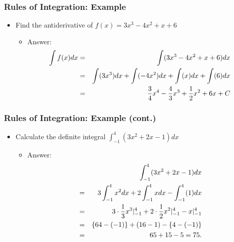 \documentclass[pdflatex, 12pt]{beamer}
\begin{document}
\begin{frame}
\frametitle{Rules of Integration: Example}
\begin{itemize}
\item Find the antiderivative of $f(x) = 3x^3 - 4x^2 + x + 6$
\vspace{0.4cm}
 \begin{itemize}
 \item Answer:
  \begin{eqnarray}
  \int f(x) dx &=& \int (3x^3 - 4x^2 + x + 6)dx \notag \\
  &=& \int (3x^3) dx + \int (-4x^2) dx + \int (x)dx + \int (6)dx \notag \\
  &=& \frac{3}{4}x^4 - \frac{4}{3}x^3 + \frac{1}{2}x^2 + 6x + C \notag
  \end{eqnarray}
 \end{itemize}
\end{itemize}
\end{frame}

\begin{frame}
\frametitle{Rules of Integration: Example (cont.)}
\begin{itemize}
\item Calculate the definite integral $\int^4_{-1} (3x^2 + 2x - 1)dx$
\vspace{0.4cm}
 \begin{itemize}
 \item Answer:
  \begin{eqnarray}
  && \int^4_{-1} (3x^2 + 2x - 1)dx \notag \\
  &=& 3\int^4_{-1} x^2 dx + 2\int^4_{-1} x dx - \int^4_{-1} (1)dx \notag \\
  &=& 3 \cdot \frac{1}{3} x^3|^4_{-1} + 2 \cdot \frac{1}{2} x^2|^4_{-1} - x|^4_{-1} \notag \\
  &=& \left\{64 - (-1)\right\} + (16 - 1) - \left\{4 - (-1)\right\} \notag \\
  &=& 65 + 15 - 5 = 75. \notag
  \end{eqnarray}
 \end{itemize}
\end{itemize}
\end{frame}
\end{document}
